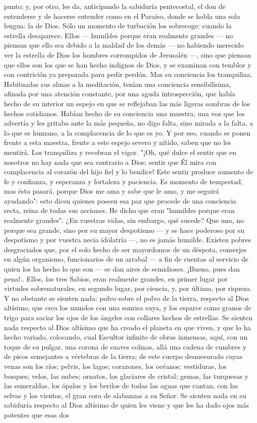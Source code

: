 \documentclass[12pt, twoside, openright]{book} %
\begin{document}
punto; y, por otro, les da, anticipando la sabiduría pentecostal, el don de entenderse y de hacerse entender como en el Paraíso, donde se habla una sola lengua: la de Dios. Sólo un momento de turbación los sobrecoge: cuando la estrella desaparece. Ellos — humildes porque eran realmente grandes — no piensan que ello sea debido a la maldad de los demás — no habiendo merecido ver la estrella de Dios los hombres corrompidos de Jerusalén —, sino que piensan que ellos son los que se han hecho indignos de Dios, y se examinan con temblor y con contrición ya preparada para pedir perdón. Mas su conciencia los tranquiliza. Habituadas sus almas a la meditación, tenían una conciencia sensibilísima, afinada por una atención constante, por una aguda introspección, que había hecho de su interior un espejo en que se reflejaban las más ligeras sombras de los hechos cotidianos. Habían hecho de su conciencia una maestra, una voz que los advertía y les gritaba ante la más pequeña, no digo falta, sino mirada a la falta, a lo que es humano, a la complacencia de lo que es yo. Y por eso, cuando se ponen frente a esta maestra, frente a este espejo severo y nítido, saben que no les mentirá. Los tranquiliza y recobran el vigor. "¡Oh, qué dulce el sentir que en nosotros no hay nada que sea contrario a Dios; sentir que Él mira con complacencia al corazón del hijo fiel y lo bendice! Este sentir produce aumento de fe y confianza, y esperanza y fortaleza y paciencia. Es momento de tempestad, mas ésta pasará, porque Dios me ama y sabe que le amo, y me seguirá ayudando": esto dicen quienes poseen esa paz que procede de una conciencia recta, reina de todas sus acciones. He dicho que eran "humildes porque eran realmente grandes". ¿En vuestras vidas, sin embargo, qué sucede? Que uno, no porque sea grande, sino por su mayor despotismo — y se hace poderoso por su despotismo y por vuestra necia idolatría —, no es jamás humilde. Existen pobres desgraciados que, por el solo hecho de ser mayordomos de un déspota, conserjes en algún organismo, funcionarios de un arrabal — a fin de cuentas al servicio de quien los ha hecho lo que son — se dan aires de semidioses. ¡Bueno, pues dan pena!.. Ellos, los tres Sabios, eran realmente grandes, en primer lugar por virtudes sobrenaturales, en segundo lugar, por ciencia, y, por último, por riqueza. Y no obstante se sienten nada: polvo sobre el polvo de la tierra, respecto al Dios altísimo, que crea los mundos con una sonrisa suya, y los esparce como granos de trigo para saciar los ojos de los ángeles con collares hechos de estrellas. Se sienten nada respecto al Dios altísimo que ha creado el planeta en que viven, y que lo ha hecho variado, colocando, cual Escultor infinito de obras inmensas, aquí, con un toque de su pulgar, una corona de suaves colinas, allá una cadena de cumbres y de picos semejantes a vértebras de la tierra; de este cuerpo desmesurado cuyas venas son los ríos; pelvis, los lagos; corazones, los océanos; vestiduras, los bosques; velos, las nubes; ornatos, los glaciares de cristal; gemas, las turquesas y las esmeraldas, los ópalos y los berilos de todas las aguas que cantan, con las selvas y los vientos, el gran coro de alabanzas a su Señor. Se sienten nada en su sabiduría respecto al Dios altísimo de quien les viene y que les ha dado ojos más potentes que esas dos 
\end{document}
